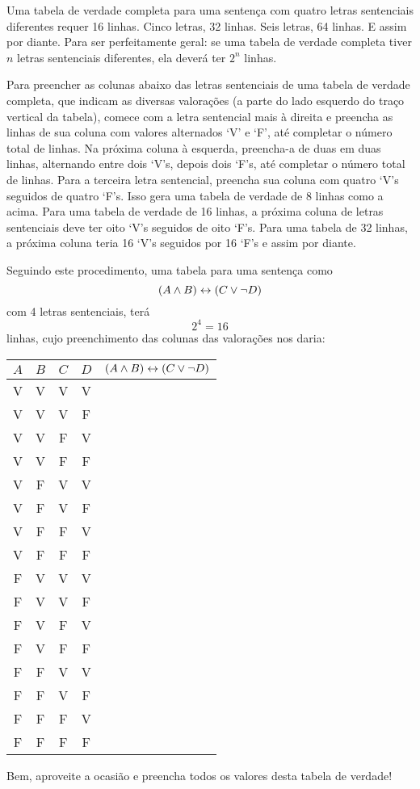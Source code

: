 Uma tabela de verdade completa para uma sentença com quatro letras sentenciais diferentes requer 16 linhas.
Cinco letras, 32 linhas.
Seis letras, 64 linhas.
E assim por diante.
Para ser perfeitamente geral: se uma tabela de verdade completa tiver $n$ letras sentenciais diferentes, ela deverá ter $2^n$ linhas.

Para preencher as colunas abaixo das letras sentenciais de uma tabela de verdade completa, que indicam as diversas valorações (a parte do lado esquerdo do traço vertical da tabela), comece com a letra sentencial mais à direita e preencha as linhas de sua coluna com valores alternados `V' e `F', até completar o número total de linhas.
Na próxima coluna à esquerda, preencha-a de duas em duas linhas, alternando entre dois `V's, depois dois `F's, até completar o número total de linhas.
Para a terceira letra sentencial, preencha sua coluna com quatro `V's seguidos de quatro `F's. Isso gera uma tabela de verdade de 8 linhas como a acima.
Para uma tabela de verdade de 16 linhas, a próxima coluna de letras sentenciais deve ter oito `V's seguidos de oito `F's.
Para uma tabela de 32 linhas, a próxima coluna teria 16 `V's seguidos por 16 `F's e assim por diante.

Seguindo este procedimento, uma tabela para uma sentença como
$$(A \wedge B) \leftrightarrow (C \vee \neg D)$$
com 4 letras sentenciais, terá
$$2^4=16$$
linhas, cujo preenchimento das colunas das valorações nos daria:
\begin{center}
\begin{tabular}{c c c c|c}
$A$&$B$&$C$&$D$&$(A \wedge B) \leftrightarrow (C \vee \neg D)$\\
\hline
V & V & V & V &  \\
V & V & V & F &  \\
V & V & F & V & \\
V & V & F & F & \\
V & F & V & V & \\
V & F & V & F & \\
V & F & F & V & \\
V & F & F & F & \\
F & V & V & V & \\
F & V & V & F & \\
F & V & F & V & \\
F & V & F & F & \\
F & F & V & V & \\
F & F & V & F & \\
F & F & F & V & \\
F & F & F & F & 
\end{tabular}
\end{center}
Bem, aproveite a ocasião e preencha todos os valores desta tabela de verdade!


